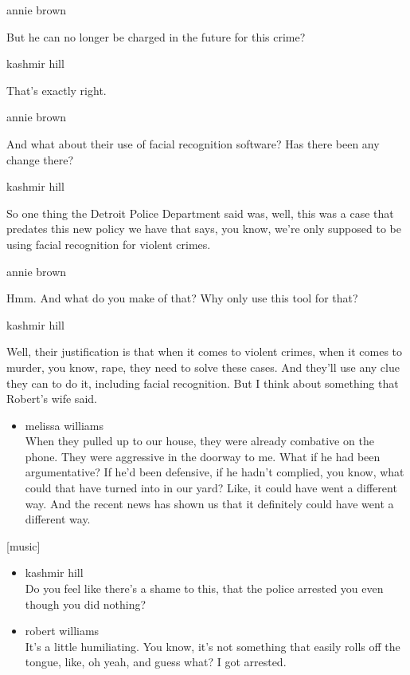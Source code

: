 annie brown

But he can no longer be charged in the future for this crime?

kashmir hill

That's exactly right.

annie brown

And what about their use of facial recognition software? Has there been
any change there?

kashmir hill

So one thing the Detroit Police Department said was, well, this was a
case that predates this new policy we have that says, you know, we're
only supposed to be using facial recognition for violent crimes.

annie brown

Hmm. And what do you make of that? Why only use this tool for that?

kashmir hill

Well, their justification is that when it comes to violent crimes, when
it comes to murder, you know, rape, they need to solve these cases. And
they'll use any clue they can to do it, including facial recognition.
But I think about something that Robert's wife said.

\begin{itemize}
\tightlist
\item
  melissa williams\\
  When they pulled up to our house, they were already combative on the
  phone. They were aggressive in the doorway to me. What if he had been
  argumentative? If he'd been defensive, if he hadn't complied, you
  know, what could that have turned into in our yard? Like, it could
  have went a different way. And the recent news has shown us that it
  definitely could have went a different way.
\end{itemize}

{[}music{]}

\begin{itemize}
\item
  kashmir hill\\
  Do you feel like there's a shame to this, that the police arrested you
  even though you did nothing?
\item
  robert williams\\
  It's a little humiliating. You know, it's not something that easily
  rolls off the tongue, like, oh yeah, and guess what? I got arrested.
\end{itemize}

